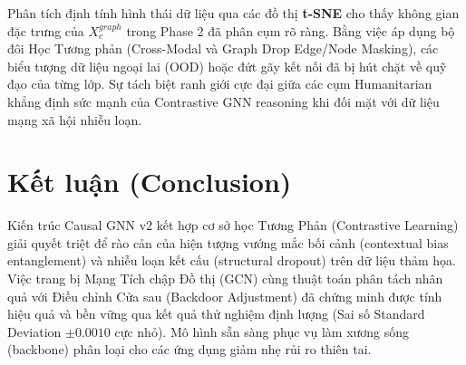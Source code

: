 \documentclass[11pt,a4paper]{article}
\begin{document}
Phân tích định tính hình thái dữ liệu qua các đồ thị \textbf{t-SNE} cho thấy không gian đặc trưng của $X_c^{graph}$ trong Phase 2 đã phân cụm rõ ràng. Bằng việc áp dụng bộ đôi Học Tương phản (Cross-Modal và Graph Drop Edge/Node Masking), các biểu tượng dữ liệu ngoại lai (OOD) hoặc đứt gãy kết nối đã bị hút chặt về quỹ đạo của từng lớp. Sự tách biệt ranh giới cực đại giữa các cụm Humanitarian khẳng định sức mạnh của Contrastive GNN reasoning khi đối mặt với dữ liệu mạng xã hội nhiễu loạn.

\section{Kết luận (Conclusion)}
Kiến trúc Causal GNN v2 kết hợp cơ sở học Tương Phản (Contrastive Learning) giải quyết triệt để rào cản của hiện tượng vướng mắc bối cảnh (contextual bias entanglement) và nhiễu loạn kết cấu (structural dropout) trên dữ liệu thảm họa. Việc trang bị Mạng Tích chập Đồ thị (GCN) cùng thuật toán phân tách nhân quả với Điều chỉnh Cửa sau (Backdoor Adjustment) đã chứng minh được tính hiệu quả và bền vững qua kết quả thử nghiệm định lượng (Sai số Standard Deviation $\pm 0.0010$ cực nhỏ). Mô hình sẵn sàng phục vụ làm xương sống (backbone) phân loại cho các ứng dụng giảm nhẹ rủi ro thiên tai.
\end{document}

